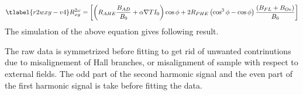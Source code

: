 \begin{equation}
    \tlabel{r2wxy-v4}
    R^{2 \omega}_{xy}  = \left[ \left( R_{AHE} \frac{B_{AD}}{B_{0}} + 
    \alpha \nabla {T} I_{0} \right) \cos{\phi} \\
    + 2 R_{PHE} \left( \cos^{3}{\phi} - \cos{\phi} \right) 
    \frac{ \left( B_{FL} + B_{Oe} \right) }{B_{0}}  \right]    
\end{equation}
The simulation of the above equation gives following result.

The raw data is symmetrized before fitting to get rid of unwanted contrinutions 
due to misalignement of Hall branches, or misalignment of sample with respect 
to external fields. The odd part of the second harmonic signal and the even
part of the first harmonic signal is take before fitting the data.
